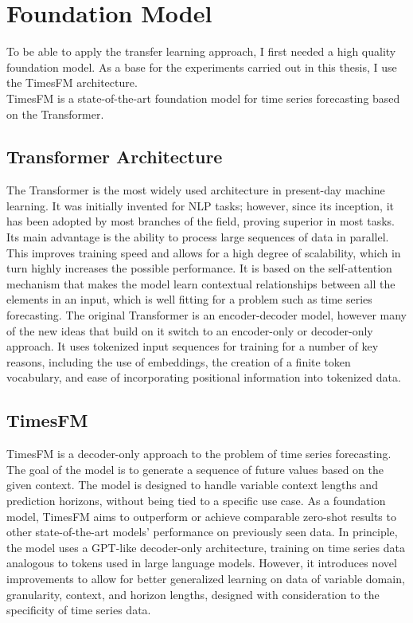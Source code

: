 \newpage
\section{Foundation Model}

To be able to apply the transfer learning approach, I first needed a high quality
foundation model. As a base for the experiments carried out in this thesis, I
use the TimesFM architecture. \\TimesFM is a state-of-the-art foundation model
for time series forecasting based on the Transformer.

\subsection {Transformer Architecture}

The Transformer is the most widely used architecture in present-day machine learning. It was initially invented for NLP tasks; however, since its inception, it has been adopted by most branches of the field, proving superior in most tasks. Its main advantage is the ability to process large sequences of data in parallel. This improves training speed and allows for a high degree of scalability, which in turn highly increases the possible performance. It is based on the self-attention mechanism that makes the model learn contextual relationships between all the elements in an input, which is well fitting for a problem such as time series forecasting. The original Transformer is an encoder-decoder model, however many of the new ideas that build on it switch to an encoder-only or decoder-only approach. It uses tokenized input sequences for training for a number of key reasons, including the use of embeddings, the creation of a finite token vocabulary, and ease of incorporating positional information into tokenized data.

\subsection{TimesFM}

TimesFM is a decoder-only approach to the problem of time series forecasting. The goal of the model is to generate a sequence of future values based on the given context. The model is designed to handle variable context lengths and prediction horizons, without being tied to a specific use case. As a foundation model, TimesFM aims to outperform or achieve comparable zero-shot results to other state-of-the-art models’ performance on previously seen data. In principle, the model uses a GPT-like decoder-only architecture, training on time series data analogous to tokens used in large language models. However, it introduces novel improvements to allow for better generalized learning on data of variable domain, granularity, context, and horizon lengths, designed with consideration to the specificity of time series data.

